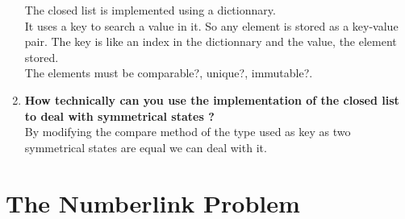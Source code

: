 \documentclass[10pt,a4paper]{article}
\begin{document}
\begin{enumerate}
	The closed list is implemented using a dictionnary.\\
	It uses a key to search a value in it. So any element is stored as a key-value pair. The key is like an index in the dictionnary and the value, the element stored.\\
	
	The elements must be comparable?, unique?, immutable?.
	
	\item \textbf{How technically can you use the implementation of the closed list to deal with symmetrical states ? }\\
	
	By modifying the compare method of the type used as key as two symmetrical states are equal we can deal with it.
	
		
\end{enumerate}

\section{The Numberlink Problem}
\end{document}
